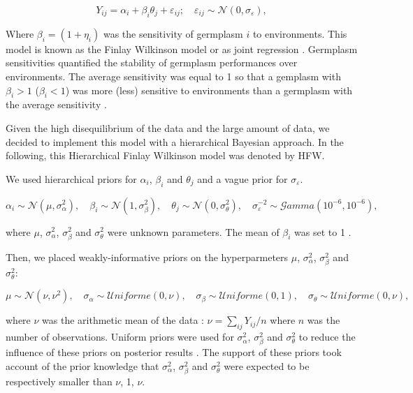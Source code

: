 \documentclass{article}\usepackage[]{graphicx}\usepackage[]{color}
\begin{document}
\begin{equation}
Y_{ij}  = \alpha_{i} + \beta_{i} \theta_{j} + \varepsilon_{ij}; \quad \varepsilon_{ij} \sim \mathcal{N} (0,\sigma_{\varepsilon}),
	\label{model2}
\end{equation}

Where $\beta_{i} = (1 + \eta_{i})$ was the sensitivity of germplasm $i$ to environments.
This model is known as the Finlay Wilkinson model or as joint regression \citep{finlay_analysis_1963}.
Germplasm sensitivities quantified the stability of germplasm performances over environments.
The average sensitivity was equal to 1 so that a gemplasm with $\beta_{i} > 1$ ($\beta_{i} < 1$) was more (less) sensitive to environments than a germplasm with the average sensitivity \citep{nabugoomu_analysis_1999}.

Given the high disequilibrium of the data and the large amount of data, we decided to implement this model with a hierarchical Bayesian approach.
In the following, this Hierarchical Finlay Wilkinson model was denoted by HFW.

We used hierarchical priors for $\alpha_i$, $\beta_i$ and $\theta_j$ and a vague prior for $\sigma_{\varepsilon}$.

\begin{displaymath}
\alpha_{i} \sim \mathcal{N} (\mu,\sigma^2_{\alpha}), \quad 
\beta_{i} \sim \mathcal{N} (1,\sigma^2_{\beta}), \quad 
\theta_{j} \sim \mathcal{N} (0,\sigma^2_{\theta}), \quad 
\sigma^{-2}_{\varepsilon} \sim \mathcal{G}amma (10^{-6},10^{-6}),
\end{displaymath}

where $\mu$, $\sigma^2_{\alpha}$, $\sigma^2_{\beta}$ and $\sigma^2_{\theta}$ were unknown parameters.
The mean of $\beta_i$ was set to 1 \citep{nabugoomu_analysis_1999}.


Then, we placed weakly-informative priors on the hyperparmeters  $\mu$, $\sigma^2_{\alpha}$, $\sigma^2_{\beta}$ and $\sigma^2_{\theta}$:

\begin{displaymath}
\mu \sim \mathcal{N} (\nu,\nu^2), \quad 
\sigma_{\alpha} \sim \mathcal{U}niforme (0,\nu), \quad 
\sigma_{\beta} \sim \mathcal{U}niforme (0,1), \quad 
\sigma_{\theta} \sim \mathcal{U}niforme (0,\nu),
\end{displaymath}

where $\nu$ was the arithmetic mean of the data : $\nu = \sum_{ij} {Y_{ij}/n}$ where $n$ was the number of observations.
Uniform priors were used for $\sigma^2_{\alpha}$, $\sigma^2_{\beta}$ and $\sigma^2_{\theta}$ to reduce the influence of these priors on posterior results \citep{gelman__2006}.
The support of these priors took account of the prior knowledge that $\sigma^2_{\alpha}$, $\sigma^2_{\beta}$ and $\sigma^2_{\theta}$ were expected to be respectively smaller than $\nu$, 1, $\nu$. \\
\end{document}

